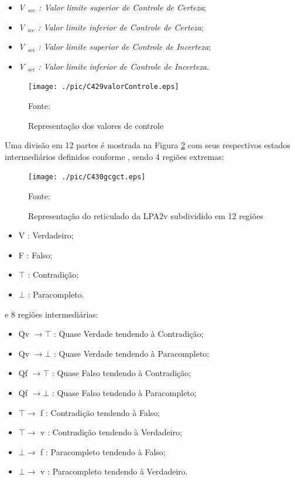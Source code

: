\begin{itemize}
\item \emph{V $_{scc}$ : Valor limite superior de Controle de Certeza};
\item \emph{V $_{icc}$ : Valor limite inferior de Controle de Certeza};
\item \emph{V $_{sci}$ : Valor limite superior de Controle de Incerteza};
\item \emph{V $_{sci}$ : Valor limite inferior de Controle de Incerteza}.

\end{itemize}

\begin{figure}[!htb]
\centering
\caption{Representação dos valores de controle}
\center\texttt{[image: ./pic/C429valorControle.eps]}
\label{fig:valorControle}

{\small Fonte: \cite{JoaoInacio}}
\end{figure}

Uma divisão em 12 partes é mostrada na Figura \ref{fig:reticuladoLPA2v} com seus respectivos estados intermediários definidos conforme \cite{JoaoInacio}, sendo 4 regiões extremas:


\begin{figure}[!htb]
\centering
\caption{Representação do reticulado da LPA2v subdividido em 12 regiões}
\center\texttt{[image: ./pic/C430gcgct.eps]}
\label{fig:reticuladoLPA2v}

{\small Fonte: \cite{JoaoInacio}}
\end{figure}


\begin{itemize}
\item V : Verdadeiro;
\item F : Falso;
\item $\top$ : Contradição;
\item $\bot$ : Paracompleto.
\end{itemize}
e 8 regiões intermediárias: 
\begin{itemize}
\item Qv $\rightarrow  \top$ : Quase Verdade tendendo à Contradição;
\item Qv $\rightarrow  \bot$ : Quase Verdade tendendo à  Paracompleto;
\item Qf $\rightarrow  \top$ : Quase Falso tendendo à Contradição;
\item Qf $\rightarrow  \bot$ : Quase Falso tendendo à Paracompleto;
\item $\top \rightarrow $ f : Contradição tendendo à Falso;
\item $\top \rightarrow $ v : Contradição tendendo à Verdadeiro;
\item $\bot \rightarrow $ f : Paracompleto tendendo à Falso;
\item $\bot \rightarrow $ v : Paracompleto tendendo à Verdadeiro.

\end{itemize}

